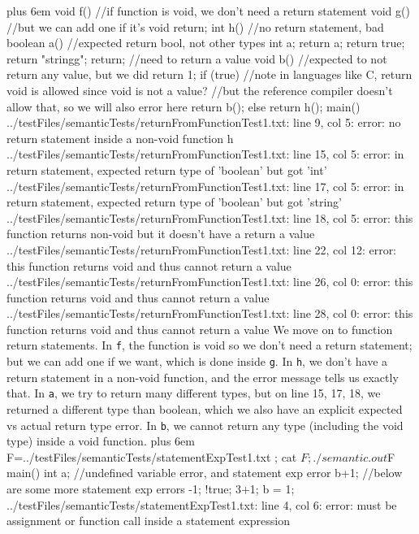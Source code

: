\documentclass{article}
\makeatletter
\newenvironment{myverb}
 {\def\@xobeysp{\ }\verbatim\rightskip=0pt plus 6em\relax}
 {\endverbatim}
\makeatother
\begin{document}
\begin{itemize}
\begin{myverb}
void f(){
    //if function is void, we don't need a return statement
}
void g(){
    //but we can add one if it's void
    return;
}
int h(){
    //no return statement, bad
}
boolean a(){
    //expected return bool, not other types
    int a;
    return a;
    return true;
    return "stringg";
    return; //need to return a value
}
void b(){
    //expected to not return any value, but we did
    return 1;
    if (true)
        //note in languages like C, return void is allowed since void is not a value?
        //but the reference compiler doesn't allow that, so we will also error here
        return b();
    else
        return h();
}
main(){}
../testFiles/semanticTests/returnFromFunctionTest1.txt: line 9, col 5: error: no return statement inside a non-void function h
../testFiles/semanticTests/returnFromFunctionTest1.txt: line 15, col 5: error: in return statement, expected return type of 'boolean' but got 'int'
../testFiles/semanticTests/returnFromFunctionTest1.txt: line 17, col 5: error: in return statement, expected return type of 'boolean' but got 'string'
../testFiles/semanticTests/returnFromFunctionTest1.txt: line 18, col 5: error: this function returns non-void but it doesn't have a return a value
../testFiles/semanticTests/returnFromFunctionTest1.txt: line 22, col 12: error: this function returns void and thus cannot return a value
../testFiles/semanticTests/returnFromFunctionTest1.txt: line 26, col 0: error: this function returns void and thus cannot return a value
../testFiles/semanticTests/returnFromFunctionTest1.txt: line 28, col 0: error: this function returns void and thus cannot return a value
\end{myverb}
We move on to function return statements.
In \verb|f|, the function is void so we don't need a return statement; but we can add one if we want, which is done inside \verb|g|. In \verb|h|, we don't have a return statement in a non-void function, and the error message tells us exactly that. In \verb|a|, we try to return many different types, but on line 15, 17, 18, we returned a different type than boolean, which we also have an explicit expected vs actual return type error.
In \verb|b|, we cannot return any type (including the void type) inside a void function.
\begin{myverb}
F=../testFiles/semanticTests/statementExpTest1.txt ; cat $F; ./semantic.out $F
main(){
    int a;
    //undefined variable error, and statement exp error
    b+1;
    //below are some more statement exp errors
    -1;
    !true;
    3+1;
    b = 1;
}
../testFiles/semanticTests/statementExpTest1.txt: line 4, col 6: error: must be assignment or function call inside a statement expression

\end{myverb}
\end{itemize}
\end{document}
